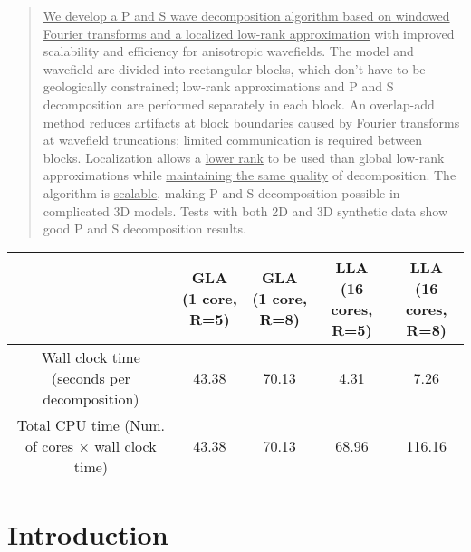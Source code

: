\documentclass[manuscript,ulem,graphix,revised]{geophysics}
\begin{document}
\begin{abstract}
\indent\indent
\marginnote{[26]}\uline{We develop a P and S wave decomposition algorithm based on windowed Fourier transforms and a localized low-rank approximation} with improved scalability and efficiency for anisotropic wavefields. The model and wavefield are divided into rectangular blocks, which don't have to be geologically constrained; low-rank approximations and P and S decomposition are performed separately in each block. An overlap-add method reduces artifacts at block boundaries caused by Fourier transforms at wavefield truncations; limited communication is required between blocks. Localization allows a \marginnote{[6]} \uline{lower rank} to be used than global low-rank approximations while \marginnote{[7]}\uline{maintaining the same quality} of decomposition. The algorithm is \marginnote{[7]}\uline{scalable}, making P and S decomposition possible in complicated 3D models. Tests with both 2D and 3D synthetic data show good P and S decomposition results.

\end{abstract}
{
  \begin{center}
  \begin{small}
    \begin{tabular}{|c|c|c|c|c|}
      \hline
       &
      \makecell{GLA \\ (1 core, R=5)}&
      \makecell{GLA \\ (1 core, R=8)}&
      \makecell{LLA \\ (16 cores, R=5)}&
      \makecell{LLA \\ (16 cores, R=8)}\\
      \hline
      \makecell{Wall clock time \\(seconds per decomposition)}&
       43.38&
       70.13&
       4.31&
       7.26\\
      \hline
      \makecell{Total CPU time \\(Num. of cores  $\times$ wall clock time)}&
       43.38&
       70.13&
       68.96&
       116.16\\
      \hline
    \end{tabular}
  \end{small}
  \end{center}
}

\section{Introduction}
\end{document}
